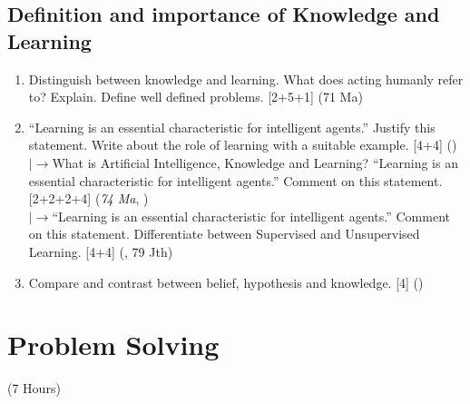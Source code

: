 \documentclass[12pt]{article}
\newcommand{\lb}{\\$\left|\rightarrow\right.$}
\begin{document}
  \subsection{Definition and importance of Knowledge and Learning}
    \begin{enumerate}[topsep=0pt, noitemsep]
      \item Distinguish between knowledge and learning. What does acting humanly refer to? Explain. Define well defined problems. \hfill [2+5+1] (71 Ma)

      \item ``Learning is an essential characteristic for intelligent agents.'' Justify this statement. Write about the role of learning with a suitable example. \hfill [4+4] ()
        \lb What is Artificial Intelligence, Knowledge and Learning? ``Learning is an essential characteristic for intelligent agents.'' Comment on this statement. \hfill [2+2+2+4] (\textit{74 Ma}, )
        \lb ``Learning is an essential characteristic for intelligent agents.'' Comment on this statement. Differentiate between Supervised and Unsupervised Learning. \hfill [4+4] (, 79 Jth)

      \item Compare and contrast between belief, hypothesis and knowledge. \hfill [4] ()
    \end{enumerate}

\pagebreak
\section{Problem Solving}
\begin{center}(7 Hours)\end{center}
\end{document}
